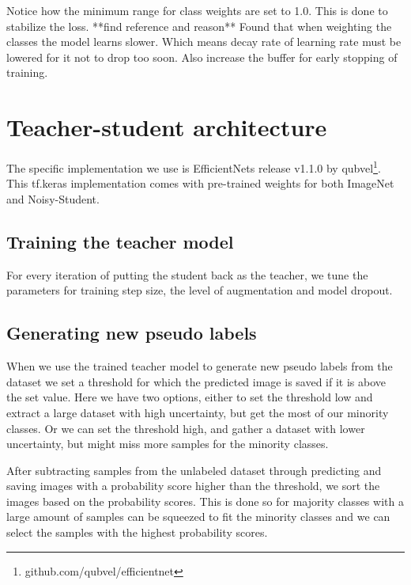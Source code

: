 \documentclass[thesis.tex]{subfiles}
\begin{document}
Notice how the minimum range for class weights are set to 1.0. This is done to stabilize the loss. **find reference and reason**
Found that when weighting the classes the model learns slower. Which means decay rate of learning rate must be lowered for it not to drop too soon. Also increase the buffer for early stopping of training.








\section{Teacher-student architecture}

The specific implementation we use is EfficientNets release v1.1.0 by qubvel\footnote{github.com/qubvel/efficientnet}. This tf.keras implementation comes with pre-trained weights for both ImageNet and Noisy-Student.





\subsection{Training the teacher model}
For every iteration of putting the student back as the teacher, we tune the parameters for training step size, the level of augmentation and model dropout.




\subsection{Generating new pseudo labels}
When we use the trained teacher model to generate new pseudo labels from the dataset we set a threshold for which the predicted image is saved if it is above the set value. Here we have two options, either to set the threshold low and extract a large dataset with high uncertainty, but get the most of our minority classes. Or we can set the threshold high, and gather a dataset with lower uncertainty, but might miss more samples for the minority classes.

After subtracting samples from the unlabeled dataset through predicting and saving images with a probability score higher than the threshold, we sort the images based on the probability scores. This is done so for majority classes with a large amount of samples can be squeezed to fit the minority classes and we can select the samples with the highest probability scores.
\end{document}
